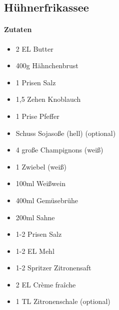 \newpage
\subsection{Hühnerfrikassee}
\paragraph{Zutaten}
\begin{itemize}[noitemsep]
	\item 2 EL Butter
	\item 400g Hähnchenbrust
	\item 1 Prisen Salz
	\item 1,5 Zehen Knoblauch
	\item 1 Prise Pfeffer
	\item Schuss Sojasoße (hell) (optional) 
	\item 4 große Champignons (weiß)
	\item 1 Zwiebel (weiß)
	\item 100ml Weißwein
	\item 400ml Gemüsebrühe
	\item 200ml Sahne
	\item 1-2 Prisen Salz
	\item 1-2 EL Mehl
	\item 1-2 Spritzer Zitronensaft
	\item 2 EL Crème fraîche
	\item 1 TL Zitronenschale (optional)
\end{itemize}
